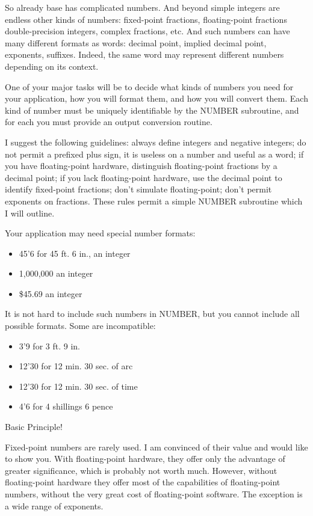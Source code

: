 \documentclass[b5paper, oneside]{book}
\begin{document}
So already base has complicated numbers. And beyond simple integers are endless other kinds of numbers: fixed-point fractions, floating-point fractions double-precision integers, complex fractions, etc. And such numbers can have many different formats as words: decimal point, implied decimal point, exponents, suffixes. Indeed, the same word may represent different numbers depending on its context.

One of your major tasks will be to decide what kinds of numbers you need for your application, how you will format them, and how you will convert them. Each kind of number must be uniquely identifiable by the NUMBER subroutine, and for each you must provide an output conversion routine.

I suggest the following guidelines: always define integers and negative integers; do not permit a prefixed plus sign, it is useless on a number and useful as a word; if you have floating-point hardware, distinguish floating-point fractions by a decimal point; if you lack floating-point hardware, use the decimal point to identify fixed-point fractions; don't simulate floating-point; don't permit exponents on fractions. These rules permit a simple NUMBER subroutine which I will outline.

Your application may need special number formats:\begin{itemize}
   \item 45'6 for 45 ft. 6 in., an integer
   \item 1,000,000 an integer
   \item \$45.69 an integer\end{itemize}
It is not hard to include such numbers in NUMBER, but you cannot include all possible formats. Some are incompatible:\begin{itemize}
   \item 3'9 for 3 ft. 9 in.
   \item 12'30 for 12 min. 30 sec. of arc
   \item 12'30 for 12 min. 30 sec. of time
   \item 4'6 for 4 shillings 6 pence\end{itemize}
Basic Principle!

Fixed-point numbers are rarely used. I am convinced of their value and would like to show you. With floating-point hardware, they offer only the advantage of greater significance, which is probably not worth much. However, without floating-point hardware they offer most of the capabilities of floating-point numbers, without the very great cost of floating-point software. The exception is a wide range of exponents.
\end{document}
